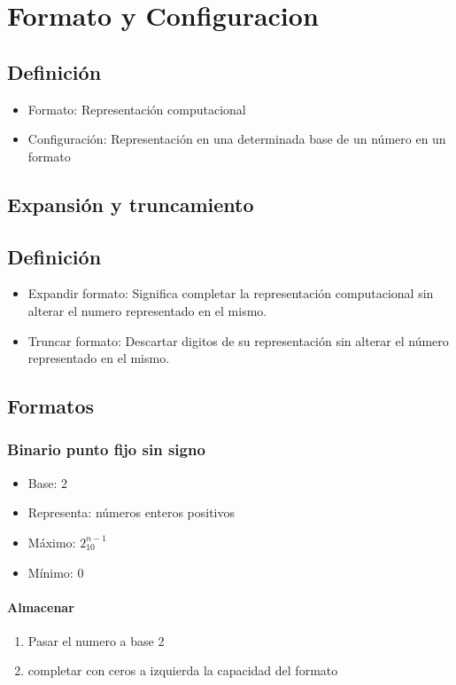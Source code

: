 \section{Formato y Configuracion}

\subsection{Definición}
\begin{itemize}
\item Formato: Representación computacional
\item Configuración: Representación en una determinada base de un número en un formato
\end{itemize}

\subsection{Expansión y truncamiento}
\subsection{Definición}
\begin{itemize}
\item Expandir formato: Significa completar la representación computacional sin alterar el numero representado
en el mismo. 
\item Truncar formato: Descartar digitos de su representación sin alterar el número representado en el mismo.
\end{itemize}

\subsection{Formatos}

\subsubsection{Binario punto fijo sin signo}
\begin{itemize}
\item Base: 2
\item Representa: números enteros positivos
\item Máximo: $2^{n-1}_{10}$
\item Mínimo: 0
\end{itemize}

\paragraph{Almacenar}
\begin{enumerate}
\item Pasar el numero a base 2
\item completar con ceros a izquierda la capacidad del formato
\end{enumerate}
